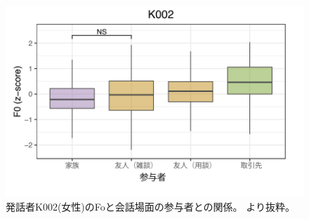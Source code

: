 
\begin{figure}[hbtp]
 \centering
   \includegraphics[width=12.0cm]{figures/ishimoto2.png}
 \caption[発話者K002(女性)のFoと会話場面の参与者との関係]{発話者K002(女性)のFoと会話場面の参与者との関係。 \cite{ishimoto}より抜粋。 }
 \label{ishimoto2:fig}
\end{figure}